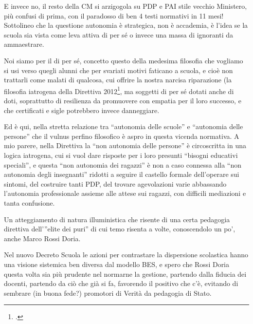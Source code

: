 E invece no, il resto della CM si arzigogola su PDP e PAI stile  vecchio Ministero, più confusi di prima, con il paradosso di ben 4 testi normativi in 11 mesi!
Sottolineo che la questione autonomia è strategica, non è accademia, è l'idea se la scuola sia vista come leva attiva di per sé o invece una  massa di ignoranti da  ammaestrare. 

Noi siamo per il di per sé, concetto questo della medesima filosofia che vogliamo si usi verso quegli alunni che per svariati motivi faticano a scuola, e cioè non trattarli come malati di qualcosa,  cui offrire la nostra narcisa  riparazione (la filosofia iatrogena della Direttiva 2012\footcite{dir27Dic2012}, ma soggetti  di per sé dotati anche di doti, soprattutto di resilienza da promuovere con empatia per il loro successo, e che certificati e sigle potrebbero invece danneggiare.  

Ed è qui, nella stretta relazione tra “autonomia delle scuole” e “autonomia delle persone” che il vulnus perfino filosofico è aspro in questa vicenda normativa. A mio parere, nella Direttiva  la “non autonomia delle persone”  è circoscritta in una logica iatrogena, cui si vuol dare risposte per i loro presunti “bisogni educativi speciali”, e questa “non autonomia dei ragazzi” è non a caso connessa alla “non autonomia degli insegnanti” ridotti a seguire il castello formale dell'operare sui sintomi, del costruire tanti PDP, del trovare agevolazioni varie abbassando l'autonomia professionale assieme alle attese sui ragazzi, con difficili mediazioni e tanta confusione.

Un atteggiamento di natura illuministica che risente di una certa pedagogia direttiva dell’”elite dei puri” di cui temo risenta  a volte, conoscendolo un po',  anche Marco Rossi Doria. 

Nel  nuovo Decreto Scuola le azioni per contrastare la dispersione scolastica hanno una visione sistemica ben diversa dal modello BES, e spero che  Rossi Doria  questa volta sia più prudente nel normarne  la gestione, partendo dalla fiducia dei docenti, partendo da ciò che già si fa, favorendo il positivo che c'è, evitando di sembrare (in buona fede?) promotori di Verità da pedagogia di Stato.
